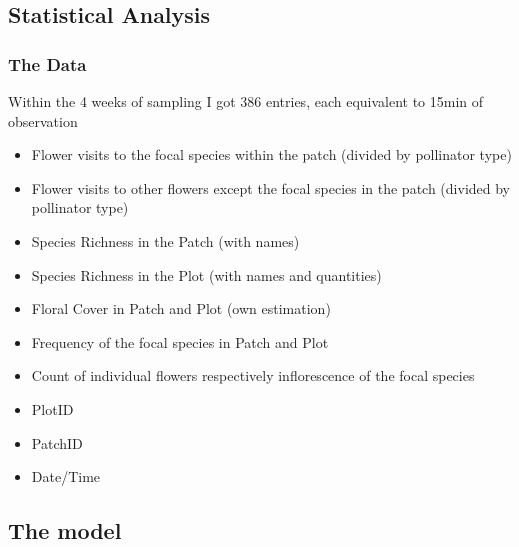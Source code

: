\subsection{Statistical Analysis}

\subsubsection{The Data}

Within the 4 weeks of sampling I got 386 entries, each equivalent to 15min of observation

\begin{itemize}
\item Flower visits to the focal species within the patch (divided by pollinator type)
\item Flower visits to other flowers except the focal species in the patch (divided by pollinator type)
\item Species Richness in the Patch (with names)
\item Species Richness in the Plot (with names and quantities)
\item Floral Cover in Patch and Plot (own estimation)
\item Frequency of the focal species in Patch and Plot
\item Count of individual flowers respectively inflorescence of the focal species
\item PlotID
\item PatchID
\item Date/Time
\end{itemize}


\subsection{The model}




  
